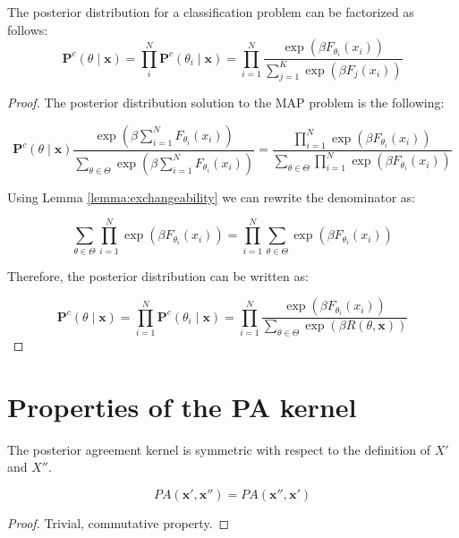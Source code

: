 \begin{theorem}

    The posterior distribution for a classification problem can be factorized as follows:
    $$
    \mathbf{P}^c(\theta \mid \bm{x}) = \prod_i^N  \mathbf{P}^c(\theta_i \mid \bm{x}) = \prod_{i=1}^N \frac{\exp \left ( \beta F_{\theta_i}(x_i) \right )}{\sum_{j=1}^K \exp \left ( \beta F_j(x_i) \right )}
    $$
\end{theorem}

\begin{proof}
    The posterior distribution solution to the MAP problem is the following:

    $$
    \mathbf{P}^c(\theta \mid \bm{x}) \frac{\exp \left ( \beta \sum_{i=1}^N F_{\theta_i}(x_i) \right )}{\sum_{\theta \in \Theta} \exp \left ( \beta \sum_{i=1}^N F_{\theta_i}(x_i) \right )}
    = \frac{\prod_{i=1}^N \exp \left ( \beta F_{\theta_i}(x_i) \right )}{\sum_{\theta \in \Theta} \prod_{i=1}^N \exp \left ( \beta  F_{\theta_i}(x_i) \right )}
    $$

    Using Lemma \ref{lemma:exchangeability} we can rewrite the denominator as:

    $$
    \sum_{\theta \in \Theta} \prod_{i=1}^N \exp \left ( \beta  F_{\theta_i}(x_i) \right ) = \prod_{i=1}^N \sum_{\theta \in \Theta} \exp \left ( \beta  F_{\theta_i}(x_i) \right )
    $$

    Therefore, the posterior distribution can be written as:

    $$
    \mathbf{P}^c(\theta \mid \bm{x}) = \prod_{i=1}^N  \mathbf{P}^c(\theta_i \mid \bm{x}) = \prod_{i=1}^N \frac{\exp \left ( \beta F_{\theta_i}(x_i) \right )}{\sum_{\theta \in \Theta} \exp \left ( \beta R(\theta, \bm{x}) \right )}
    $$

\end{proof}

\section{Properties of the PA kernel}\label{sec:appendix_pa}

\begin{theorem}
    The posterior agreement kernel is symmetric with respect to the definition of $X'$ and $X''$.

    $$
    PA(\bm{x}', \bm{x}'') = PA(\bm{x}'', \bm{x}')
    $$
\end{theorem}

\begin{proof}
    Trivial, commutative property.
\end{proof}


